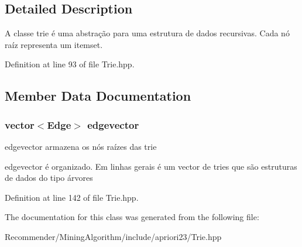 \subsection{Detailed Description}
A classe trie é uma abstração para uma estrutura de dados recursivas. Cada nó raíz representa um itemset. 



Definition at line 93 of file Trie.hpp.

\subsection{Member Data Documentation}
\subsubsection{\setlength{\rightskip}{0pt plus 5cm}vector$<${\bf Edge}$>$ {\bf edgevector}\hspace{0.3cm}{\tt  [private]}}\label{classTrie_3dd0e49d650f9d55898a747ef135a01d}


edgevector armazena os nós raízes das trie

edgevector é organizado. Em linhas gerais é um vector de tries que são estruturas de dados do tipo árvores 

Definition at line 142 of file Trie.hpp.

The documentation for this class was generated from the following file:\begin{CompactItemize}
\item 
Recommender/MiningAlgorithm/include/apriori23/Trie.hpp\end{CompactItemize}
